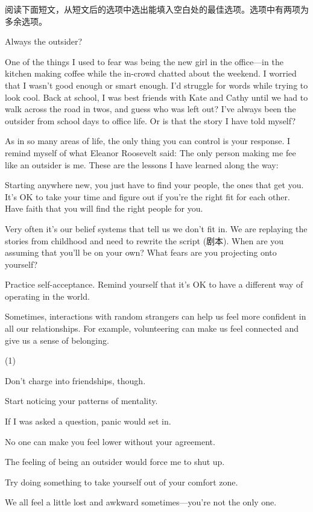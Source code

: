 \documentclass{英语试卷}
\begin{document}
\par 阅读下面短文，从短文后的选项中选出能填入空白处的最佳选项。选项中有两项为多余选项。\par
\par Always the outsider?\par
\par One of the things I used to fear was being the new girl in the office—in the kitchen making coffee while the in-crowd chatted about the weekend. I worried that I wasn't good enough or smart enough.  I'd struggle for words while trying to look cool. Back at school, I was best friends with Kate and Cathy until we had to walk across the road in twos, and guess who was left out? I've always been the outsider from school days to office life. Or is that the story I have told myself?\par
\par As in so many areas of life, the only thing you can control is your response. I remind myself of what Eleanor Roosevelt said:  The only person making me fee like an outsider is me. These are the lessons I have learned along the way:\par
\par Starting anywhere new, you just have to find your people, the ones that get you.  It's OK to take your time and figure out if you're the right fit for each other. Have faith that you will find the right people for you.\par
\par Very often it's our belief systems that tell us we don't fit in. We are replaying the stories from childhood and need to rewrite the script (剧本).  When are you assuming that you'll be on your own? What fears are you projecting onto yourself?\par
\par Practice self-acceptance. Remind yourself that it's OK to have a different way of operating in the world.\par
\par {} Sometimes, interactions with random strangers can help us feel more confident in all our relationships. For example, volunteering can make us feel connected and give us a sense of belonging.\par
\begin{choices}(1)
  \item Don't charge into friendships, though.
  \item Start noticing your patterns of mentality.
  \item If I was asked a question, panic would set in.
  \item No one can make you feel lower without your agreement.
  \item The feeling of being an outsider would force me to shut up.
  \item Try doing something to take yourself out of your comfort zone.
  \item We all feel a little lost and awkward sometimes—you're not the only one.
\end{choices}
\end{document}
